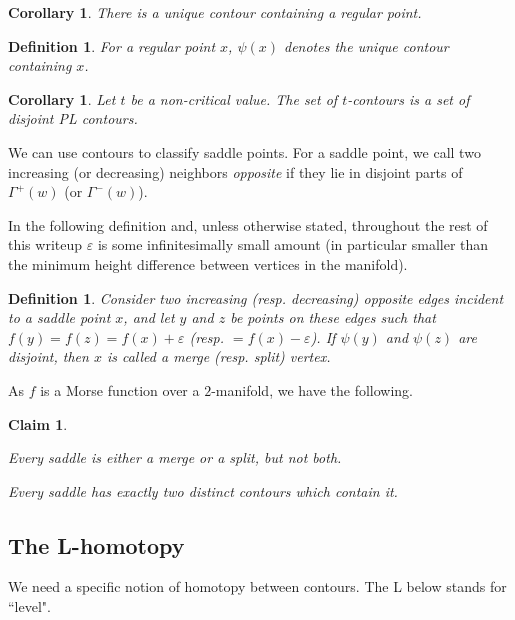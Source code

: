 \documentclass[11pt]{article}
\newtheorem{claim}[theorem]{Claim}
\newtheorem{corollary}[theorem]{Corollary}
\newtheorem{definition}[theorem]{Definition}
\theoremstyle{definition}
\newcommand{\eps}{\varepsilon}
\newcommand{\cont}{\psi}
\begin{document}
\begin{corollary}
There is a unique contour containing a regular point.
\end{corollary}

\begin{definition} \label{def:p-cont}
For a regular point $x$, $\cont(x)$ denotes the unique contour containing $x$.
\end{definition}


\begin{corollary} \label{cor:cont} Let $t$ be a non-critical value. The set of $t$-contours is a set
of disjoint PL contours.
\end{corollary}

We can use contours to classify saddle points. For a saddle point, we call two increasing (or decreasing) neighbors \emph{opposite}
if they lie in disjoint parts of $\Gamma^+(w)$ (or $\Gamma^-(w)$).

In the following definition and, unless otherwise stated, throughout the rest of this writeup $\eps$ is some infinitesimally small amount
(in particular smaller than the minimum height difference between vertices in the manifold).

\begin{definition} \label{def:merge} Consider two increasing (resp. decreasing) opposite edges incident to a saddle point $x$,
and let $y$ and $z$ be points on these edges such that $f(y) = f(z) = f(x) + \eps$ (resp. $=f(x) - \eps$).
If $\cont(y)$ and $\cont(z)$ are disjoint, then $x$ is called a \emph{merge} (resp. \emph{split}) vertex.
\end{definition}

As $f$ is a Morse function over a $2$-manifold, we have the following.

\begin{claim} \label{clm:saddle} 
  \begin{compactenum}[(1)]
    \item Every saddle is either a merge or a split, but not both.
    \item Every saddle has exactly two distinct contours which contain it.
  \end{compactenum}
\end{claim}


\subsection{The L-homotopy} \label{sec:l-hom}
We need a specific notion of homotopy between contours. The L below stands for ``level".
\end{document}
